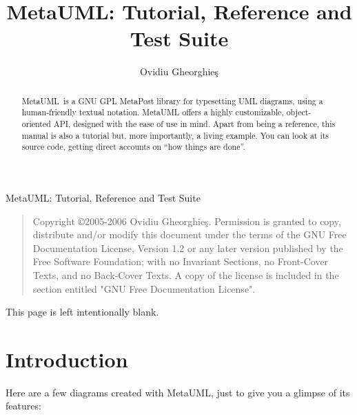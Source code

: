 \documentclass{article}
\newcommand{\metauml}{MetaUML}
\begin{document}
\metauml: Tutorial, Reference and Test Suite

\begin{quote}
    Copyright \copyright 2005-2006 Ovidiu Gheorghie\c{s}.
    Permission is granted to copy, distribute and/or modify this document
    under the terms of the GNU Free Documentation License, Version 1.2
    or any later version published by the Free Software Foundation;
    with no Invariant Sections, no Front-Cover Texts, and no Back-Cover Texts.
    A copy of the license is included in the section entitled "GNU
    Free Documentation License".
\end{quote}

\pagebreak
This page is left intentionally blank.

\pagebreak
\title{\metauml: Tutorial, Reference and Test Suite}

\author{Ovidiu Gheorghie\c{s}}

\maketitle

\begin{abstract}
\metauml\ is a GNU GPL MetaPost library for typesetting UML diagrams, using a human-friendly textual notation. MetaUML offers a highly customizable, object-oriented API, designed with the ease of use in mind. Apart from being a reference, this manual is also a tutorial but, more importantly, a living example. You can look at its source code, getting direct accounts on ``how things are done''.
\end{abstract}


\section{Introduction}

Here are a few diagrams created with MetaUML, just to give you a glimpse of its features:
\end{document}
